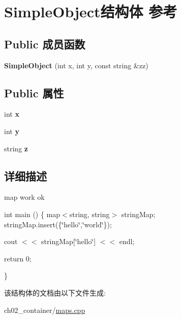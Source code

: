 \hypertarget{struct_simple_object}{}\section{Simple\+Object结构体 参考}
\label{struct_simple_object}
\subsection*{Public 成员函数}
\begin{DoxyCompactItemize}
\item 
\mbox{\label{struct_simple_object_a51eb94f8ea9d0bfd7b5eba3aca144451}} 
{\bfseries Simple\+Object} (int x, int y, const string \&zz)
\end{DoxyCompactItemize}
\subsection*{Public 属性}
\begin{DoxyCompactItemize}
\item 
\mbox{\label{struct_simple_object_a27aa3fcb3802c0015bc12b43d1ad77a0}} 
int {\bfseries x}
\item 
\mbox{\label{struct_simple_object_ab90f62808254c0e11d9a6f8e4631fb78}} 
int {\bfseries y}
\item 
\mbox{\label{struct_simple_object_a7a4ee35328bd1d4e6df6309c208eb2e9}} 
string {\bfseries z}
\end{DoxyCompactItemize}


\subsection{详细描述}
map work ok

int main () \{ map$<$string, string$>$ string\+Map; string\+Map.\+insert(\{\char`\"{}hello\char`\"{},\char`\"{}world\char`\"{}\});

cout $<$$<$ string\+Map\mbox{[}\char`\"{}hello\char`\"{}\mbox{]} $<$$<$ endl;

return 0;

\} 

该结构体的文档由以下文件生成\+:\begin{DoxyCompactItemize}
\item 
ch02\+\_\+container/\mbox{\hyperlink{maps_8cpp}{maps.\+cpp}}\end{DoxyCompactItemize}
